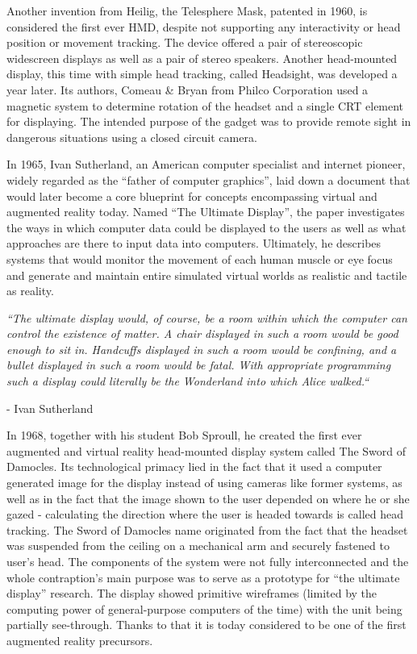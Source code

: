 \documentclass[12pt, a4paper]{article}
\begin{document}
Another invention from Heilig, the Telesphere Mask, patented in 1960, is considered the first ever HMD, despite not supporting any interactivity or head position or movement tracking. The device offered a pair of stereoscopic widescreen displays as well as a pair of stereo speakers. Another head-mounted display, this time with simple head tracking, called Headsight, was developed a year later. Its authors, Comeau \& Bryan from Philco Corporation used a magnetic system to determine rotation of the headset and a single CRT element for displaying. The intended purpose of the gadget was to provide remote sight in dangerous situations using a closed circuit camera.

In 1965, Ivan Sutherland, an American computer specialist and internet pioneer, widely regarded as the “father of computer graphics”, laid down a document that would later become a core blueprint for concepts encompassing virtual and augmented reality today. Named “The Ultimate Display”, the paper investigates the ways in which computer data could be displayed to the users as well as what approaches are there to input data into computers. Ultimately, he describes systems that would monitor the movement of each human muscle or eye focus and generate and maintain entire simulated virtual worlds as realistic and tactile as reality.

\begin{displayquote}
\textit{“The ultimate display would, of course, be a room within which the computer can control the existence of matter. A chair displayed in such a room would be good enough to sit in. Handcuffs displayed in such a room would be confining, and a bullet displayed in such a room would be fatal. With appropriate programming such a display could literally be the Wonderland into which Alice walked.“}
\end{displayquote}
\begin{flushright}
- Ivan Sutherland
\end{flushright}

In 1968, together with his student Bob Sproull, he created the first ever augmented and virtual reality head-mounted display system called The Sword of Damocles. Its technological primacy lied in the fact that it used a computer generated image for the display instead of using cameras like former systems, as well as in the fact that the image shown to the user depended on where he or she gazed - calculating the direction where the user is headed towards is called head tracking. The Sword of Damocles name originated from the fact that the headset was suspended from the ceiling on a mechanical arm and securely fastened to user’s head. The components of the system were not fully interconnected and the whole contraption’s main purpose was to serve as a prototype for “the ultimate display” research. The display showed primitive wireframes (limited by the computing power of general-purpose computers of the time) with the unit being partially see-through. Thanks to that it is today considered to be one of the first augmented reality precursors.
\end{document}
